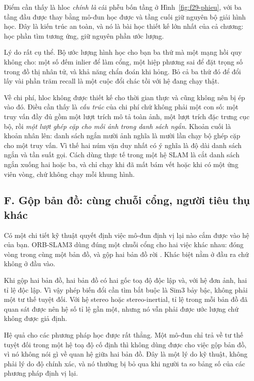 \documentclass[../../deep_learning.tex]{subfiles}
\begin{document}
Điểm cần thấy là hloc \emph{chính là} cái phễu bốn tầng ở Hình~\ref{fig:f29-phieu}, với ba tầng đầu được thay bằng mô-đun học được và tầng cuối giữ nguyên bộ giải hình học. Đây là kiến trúc an toàn, và nó là bài học thiết kế lớn nhất của cả chương: học phần tìm tương ứng, giữ nguyên phần ước lượng.

Lý do rất cụ thể. Bộ ước lượng hình học cho bạn ba thứ mà một mạng hồi quy không cho: một số đếm inlier để làm cổng, một hiệp phương sai để đặt trọng số trong đồ thị nhân tử, và khả năng chẩn đoán khi hỏng. Bỏ cả ba thứ đó để đổi lấy vài phần trăm recall là một cuộc đổi chác tồi với hệ đang chạy thật.

Về chi phí, hloc không được thiết kế cho thời gian thực và cũng không nên bị ép vào đó. Điều cần thấy là \emph{cấu trúc} của chi phí chứ không phải một con số: một truy vấn đầy đủ gồm một lượt trích mô tả toàn ảnh, một lượt trích đặc trưng cục bộ, rồi \emph{một lượt ghép cặp cho mỗi ảnh trong danh sách ngắn}. Khoản cuối là khoản nhân lên: danh sách ngắn mười ảnh nghĩa là mười lần chạy bộ ghép cặp cho một truy vấn. Vì thế hai núm vặn duy nhất có ý nghĩa là độ dài danh sách ngắn và tần suất gọi. Cách dùng thực tế trong một hệ SLAM là cắt danh sách ngắn xuống hai hoặc ba, và chỉ chạy khi đã mất bám vết hoặc khi có một ứng viên vòng, chứ không chạy mỗi khung hình.

\subsection{F. Gộp bản đồ: cùng chuỗi cổng, người tiêu thụ khác}
Có một chi tiết kỹ thuật quyết định việc mô-đun định vị lại nào cắm được vào hệ của bạn. ORB-SLAM3 dùng đúng một chuỗi cổng cho hai việc khác nhau: đóng vòng trong cùng một bản đồ, và gộp hai bản đồ rời \cite{campos2021orbslam3}. Khác biệt nằm ở đầu ra chứ không ở đầu vào.

Khi gộp hai bản đồ, hai bản đồ có hai gốc toạ độ độc lập và, với hệ đơn ảnh, hai tỉ lệ độc lập. Vì vậy phép biến đổi cần tìm bắt buộc là Sim3 bảy bậc, không phải một tư thế tuyệt đối. Với hệ stereo hoặc stereo-inertial, tỉ lệ trong mỗi bản đồ đã quan sát được nên hệ số tỉ lệ gần một, nhưng nó vẫn phải được ước lượng chứ không được giả định.

Hệ quả cho các phương pháp học được rất thẳng. Một mô-đun chỉ trả về tư thế tuyệt đối trong một hệ toạ độ cố định thì không dùng được cho việc gộp bản đồ, vì nó không nói gì về quan hệ giữa hai bản đồ. Đây là một lý do kỹ thuật, không phải lý do độ chính xác, và nó thường bị bỏ qua khi người ta so bảng số của các phương pháp định vị lại.
\end{document}
